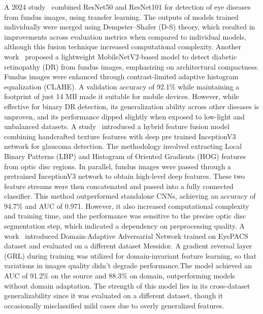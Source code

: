 \documentclass{ijclclp}
\begin{document}
A 2024 study~\cite{du2024recognition} combined ResNet50 and ResNet101 for detection of eye diseases from fundus images, using transfer learning. The outputs of models trained individually  were merged using Dempster–Shafer (D-S) theory, which resulted in improvements across evaluation metrics when compared to individual models, although this fusion technique increased computational complexity. Another work~\cite{yassin2023fundus} proposed a lightweight MobileNetV2-based model to detect diabetic retinopathy (DR) from fundus images, emphasizing on architectural compactness. Fundus images were enhanced through contrast-limited adaptive histogram equalization (CLAHE). A validation accuracy of 92.1\% while maintaining a footprint of just 14 MB made it suitable for mobile devices. However, while effective for binary DR detection, its generalization ability across other diseases is unproven, and its performance dipped slightly when exposed to low-light and unbalanced datasets. 
\newline
\newline
A study~\cite{singh2024novel} introduced a hybrid feature fusion model combining handcrafted texture features with deep pre trained InceptionV3 network for glaucoma detection. The methodology involved extracting Local Binary Patterns (LBP) and Histogram of Oriented Gradients (HOG) features from optic disc regions. In parallel, fundus images were passed through a pretrained InceptionV3 network to obtain high-level deep features. These two feature streams were then concatenated and passed into a fully connected classifier.  This method outperformed standalone CNNs, achieving an accuracy of 94.7\% and AUC of 0.971. However, it also increased computational complexity and training time, and the performance was sensitive to the precise optic disc segmentation step, which indicated a dependency on preprocessing quality. 
\newline
\newline
A work~\cite{li2023cross} introduced Domain-Adaptive Adversarial Network trained on EyePACS dataset and evaluated on a different dataset Messidor. A gradient reversal layer (GRL) during training was utilized for domain-invariant feature learning, so that variations in images quality didn’t degrade performance.The model achieved an AUC of 91.2\% on the source and 88.3\% on domain, outperforming models without domain adaptation. The strength of this model lies in its cross-dataset generalizability since it was evaluated on a different dataset, though it occasionally misclassified mild cases due to overly generalized features. 
\end{document}
